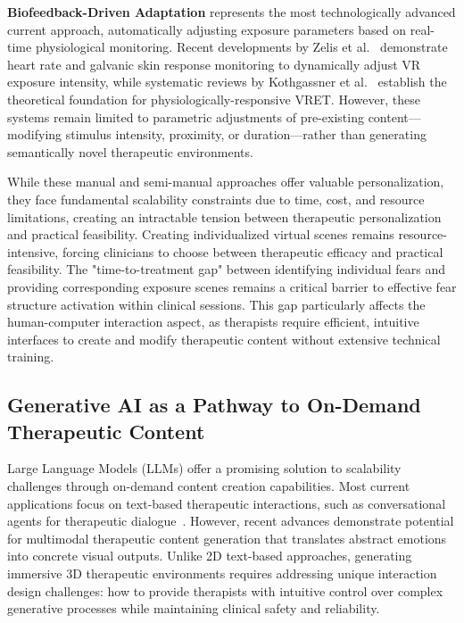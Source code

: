 \documentclass[]{interact}
\begin{document}
\textbf{Biofeedback-Driven Adaptation} represents the most technologically advanced current approach, automatically adjusting exposure parameters based on real-time physiological monitoring. Recent developments by Zelis et al.~\cite{zelis2025adaptive} demonstrate heart rate and galvanic skin response monitoring to dynamically adjust VR exposure intensity, while systematic reviews by Kothgassner et al.~\cite{kothgassner2022virtual} establish the theoretical foundation for physiologically-responsive VRET. However, these systems remain limited to parametric adjustments of pre-existing content—modifying stimulus intensity, proximity, or duration—rather than generating semantically novel therapeutic environments.

While these manual and semi-manual approaches offer valuable personalization, they face fundamental scalability constraints due to time, cost, and resource limitations, creating an intractable tension between therapeutic personalization and practical feasibility. Creating individualized virtual scenes remains resource-intensive, forcing clinicians to choose between therapeutic efficacy and practical feasibility. The "time-to-treatment gap" between identifying individual fears and providing corresponding exposure scenes remains a critical barrier to effective fear structure activation within clinical sessions. This gap particularly affects the human-computer interaction aspect, as therapists require efficient, intuitive interfaces to create and modify therapeutic content without extensive technical training.

\subsection{Generative AI as a Pathway to On-Demand Therapeutic Content}

Large Language Models (LLMs) offer a promising solution to scalability challenges through on-demand content creation capabilities. Most current applications focus on text-based therapeutic interactions, such as conversational agents for therapeutic dialogue~\cite{fitzpatrick2017delivering}. However, recent advances demonstrate potential for multimodal therapeutic content generation that translates abstract emotions into concrete visual outputs. Unlike 2D text-based approaches, generating immersive 3D therapeutic environments requires addressing unique interaction design challenges: how to provide therapists with intuitive control over complex generative processes while maintaining clinical safety and reliability.
\end{document}
